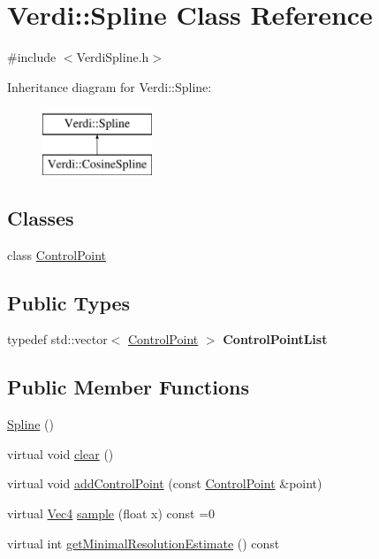 \hypertarget{class_verdi_1_1_spline}{\section{\-Verdi\-:\-:\-Spline \-Class \-Reference}
\label{class_verdi_1_1_spline}
}


{\ttfamily \#include $<$\-Verdi\-Spline.\-h$>$}

\-Inheritance diagram for \-Verdi\-:\-:\-Spline\-:\begin{figure}[H]
\begin{center}
\leavevmode
\includegraphics[height=2.000000cm]{class_verdi_1_1_spline}
\end{center}
\end{figure}
\subsection*{\-Classes}
\begin{DoxyCompactItemize}
\item 
class \hyperlink{class_verdi_1_1_spline_1_1_control_point}{\-Control\-Point}
\end{DoxyCompactItemize}
\subsection*{\-Public \-Types}
\begin{DoxyCompactItemize}
\item 
\hypertarget{class_verdi_1_1_spline_a4d4b1b6ab3bacb22f3a3a6086d7fd16d}{typedef std\-::vector$<$ \hyperlink{class_verdi_1_1_spline_1_1_control_point}{\-Control\-Point} $>$ {\bfseries \-Control\-Point\-List}}\label{class_verdi_1_1_spline_a4d4b1b6ab3bacb22f3a3a6086d7fd16d}

\end{DoxyCompactItemize}
\subsection*{\-Public \-Member \-Functions}
\begin{DoxyCompactItemize}
\item 
\hyperlink{class_verdi_1_1_spline_a851bc8eba73b028b7fee3fc63fac53c0}{\-Spline} ()
\item 
virtual void \hyperlink{class_verdi_1_1_spline_afb198357ae6815daef084726d5848d5c}{clear} ()
\item 
virtual void \hyperlink{class_verdi_1_1_spline_a5df1e07e60852cf913a1bc7d40f662bc}{add\-Control\-Point} (const \hyperlink{class_verdi_1_1_spline_1_1_control_point}{\-Control\-Point} \&point)
\item 
virtual \hyperlink{class_verdi_1_1_vec4}{\-Vec4} \hyperlink{class_verdi_1_1_spline_aabbae06e6368758e1a689eeacb324f66}{sample} (float x) const =0
\item 
virtual int \hyperlink{class_verdi_1_1_spline_a71288ebeb442abd1b93d0967819af247}{get\-Minimal\-Resolution\-Estimate} () const 
\end{DoxyCompactItemize}
